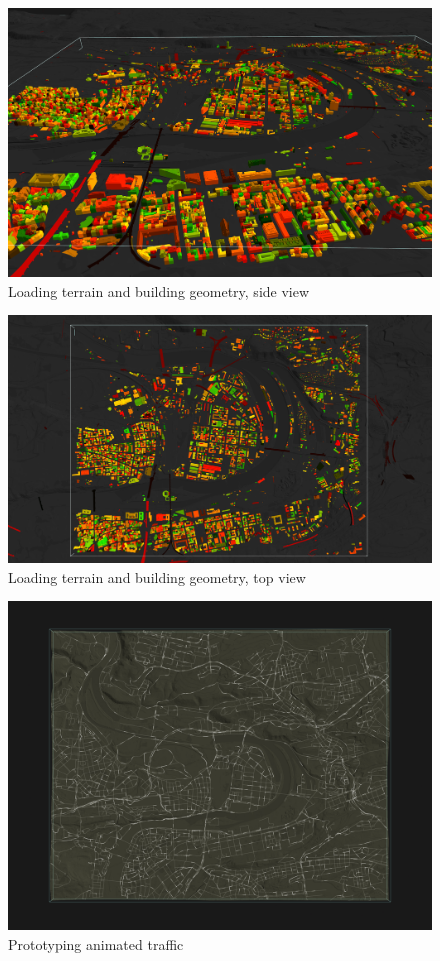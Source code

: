 \begin{figure}[h]
    \centering
    \includegraphics[width=\linewidth]{figures/metacity0.png}
    \caption{Loading terrain and building geometry, side view}
    \label{fig:metacit1}
\end{figure}

\begin{figure}[h]
    \centering
    \includegraphics[width=\linewidth]{figures/webPrototype1.png}
    \caption{Loading terrain and building geometry, top view}
\end{figure}

\begin{figure}[h]
    \centering
    \includegraphics[width=\linewidth]{figures/webPrototype2.png}
    \caption{Prototyping animated traffic}
\end{figure}


